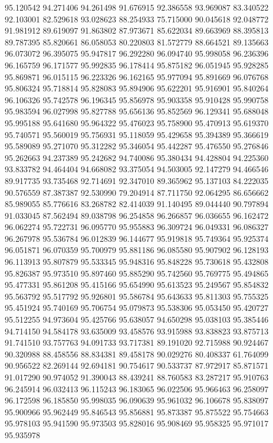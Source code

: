 95.120542
94.271406
94.261498
91.676915
92.386558
93.969087
83.340522
92.103001
82.529618
93.028623
88.254933
75.715000
90.045618
92.048772
91.981912
89.619097
91.863802
87.973671
85.622034
89.663969
88.395813
89.787395
85.820661
86.058053
80.220803
81.572779
88.664521
89.135663
96.073072
96.395075
95.947817
96.292280
96.094740
95.998058
96.236396
96.165759
96.171577
95.992835
96.178414
95.875182
96.051945
95.928285
95.869871
96.015115
96.223326
96.162165
95.977094
95.891669
96.076768
95.806324
95.718814
95.828083
95.894906
95.622201
95.916901
95.840264
96.106326
95.742578
96.196345
95.856978
95.903358
95.910428
95.990758
95.983594
96.027998
95.827788
95.656136
95.852569
96.129341
95.688048
95.995188
95.641680
95.964322
95.476023
95.758900
95.470913
95.619370
95.740571
95.560019
95.756931
95.118059
95.429658
95.394389
95.366619
95.589089
95.271070
95.312282
95.346054
95.442287
95.476550
95.276846
95.262663
94.237389
95.242682
94.740086
95.380434
94.428804
94.225360
93.833782
94.464404
94.668082
93.375054
94.503005
92.147279
94.466546
89.917735
93.735468
92.714691
92.347010
89.365962
95.137103
84.222035
90.576559
87.387387
92.530990
79.204914
87.711750
92.064295
86.656662
85.989055
85.776616
83.268782
82.414039
91.140495
89.044440
90.797894
91.033045
87.562494
89.038798
96.254858
96.266857
96.036655
96.162472
96.062274
95.722731
96.095770
95.955883
96.309724
96.049331
96.086327
96.267978
95.536784
96.012839
96.144677
95.919818
95.749364
95.925374
96.051871
96.070359
95.700979
95.881186
96.085580
95.907902
96.128193
96.113913
95.807879
95.533345
95.948316
95.848228
95.730618
95.432808
95.826387
95.973510
95.897460
95.885290
95.742560
95.769775
95.494865
95.477331
95.861208
95.415166
95.654990
95.613523
95.249567
95.854832
95.563792
95.517792
95.926801
95.586784
95.643633
95.811303
95.755325
95.451924
95.740169
95.706754
95.079873
95.538306
95.053450
95.420727
95.512255
94.973604
95.425766
95.638057
94.650298
95.038103
95.385446
94.714150
94.584178
93.635009
93.458576
93.915988
93.838823
93.875713
91.741510
93.757763
94.091733
93.717381
89.191020
92.715988
90.924467
90.320988
88.458556
88.834381
89.458178
90.029276
80.408337
61.764099
90.956522
82.269144
92.694181
90.754617
90.533737
87.972917
85.871571
91.017290
90.974052
91.390043
88.439241
88.760583
83.287217
95.910763
96.245914
96.032413
96.115243
96.183065
96.022506
95.966463
96.258097
96.172598
96.185850
95.998035
96.090639
95.961032
96.106678
95.838097
95.900966
95.962449
95.846543
95.856881
95.873387
95.875522
95.754663
95.978103
95.941590
95.973503
95.828016
95.908469
95.958325
95.971017
95.935978
